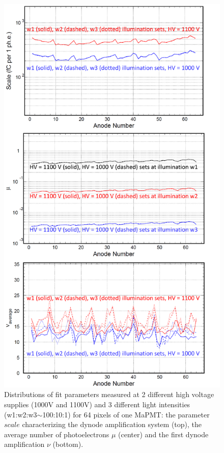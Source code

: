 \documentclass[5p,times,twocolumn]{elsarticle}
\begin{document}
\begin{figure}[b]
\begin{center}
	\includegraphics[width=1.05\linewidth]{H12700_passport.pdf}
	\caption{Distributions of fit parameters measured at 2 different high
          voltage supplies  (1000V and 1100V) and 3 different  light intensities (w1:w2:w3$\sim$100:10:1) for 64  pixels of one MaPMT: the parameter $scale$   characterizing
          the dynode amplification system (top), the average number of photoelectrons $\mu$ (center) and the first dynode amplification $\nu$ (bottom).}
	\label{fig:PavelPassport}
\end{center}
\end{figure}
\end{document}
